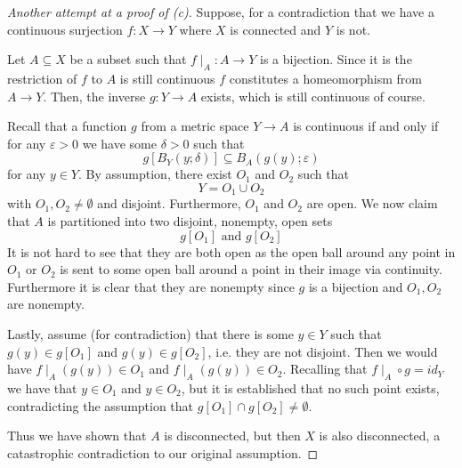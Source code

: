 \begin{proof}[Another attempt at a proof of (c)]
    Suppose, for a contradiction that we have a 
    continuous surjection $f: X \to Y$ where $X$ is connected and 
    $Y$ is not. 

    Let $A \subseteq X$ be a subset such that $f\mid_A : A \to Y$ 
    is a bijection. Since it is the restriction of $f$ to $A$ is 
    still continuous $f$ constitutes a homeomorphism from $A \to Y$.
    Then, the inverse $g : Y \to A$ exists, which is still continuous 
    of course. 

    Recall that a function $g$ from a metric space $Y \to A$ is 
    continuous if and only if for any $\varepsilon > 0$ we 
    have some $\delta > 0$ such that 
    \[
        g\left[B_Y(y;\delta)\right] \subseteq B_A(g(y);\varepsilon)
    \]
    for any $y \in Y$.
    By assumption, there exist $O_1$ and $O_2$ such that 
    \[
        Y = O_1 \cup O_2
    \]
    with $O_1, O_2 \neq \emptyset$ and disjoint. 
    Furthermore, $O_1$ and $O_2$ are open. 
    We now claim that $A$ is partitioned into 
    two disjoint, nonempty, open sets
    \[
        g[O_1] \text{ and } g[O_2]
    \]
    It is not hard to see that they are both open as the 
    open ball around any point in $O_1$ or $O_2$ is sent to 
    some open ball around a point in their image via continuity. 
    Furthermore it is clear that they are nonempty since 
    $g$ is a bijection and $O_1, O_2$ are nonempty. 

    Lastly, assume (for contradiction) 
    that there is some $y \in Y$ such that 
    $g(y) \in g[O_1]$ and $g(y) \in g[O_2]$, i.e. 
    they are not disjoint. 
    Then we would have $f\mid_A(g(y)) \in O_1$ and 
    $f\mid_A(g(y)) \in O_2$. Recalling that $f\mid_A \circ g = id_Y$ 
    we have that $y \in O_1$ and $y \in O_2$, but it is established 
    that no such point exists, contradicting the 
    assumption that $g[O_1] \cap g[O_2] \neq \emptyset$.

    Thus we have shown that $A$ is disconnected, but then 
    $X$ is also disconnected, a catastrophic contradiction to 
    our original assumption.
\end{proof}

